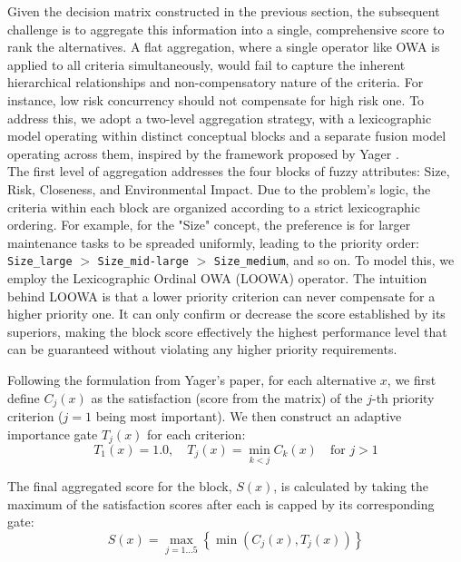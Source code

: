 Given the decision matrix constructed in the previous section, the subsequent challenge is to aggregate this information into a single, comprehensive score to rank the alternatives. A flat aggregation, where a single operator like OWA is applied to all criteria simultaneously, would fail to capture the inherent hierarchical relationships and non-compensatory nature of the criteria. 
For instance, low risk concurrency should not compensate for high risk one. 
To address this, we adopt a two-level aggregation strategy, with a lexicographic model operating within distinct conceptual blocks and a separate fusion model operating across them, inspired by the framework proposed by Yager \cite{LOOWA}.\\

The first level of aggregation addresses the four blocks of fuzzy attributes: Size, Risk, Closeness, and Environmental Impact. Due to the problem's logic, the criteria within each block are organized according to a strict lexicographic ordering. For example, for the "Size" concept, the preference is for larger maintenance tasks to be spreaded uniformly, leading to the priority order: \texttt{Size\_large} $>$ \texttt{Size\_mid-large} $>$ \texttt{Size\_medium}, and so on. 
To model this, we employ the Lexicographic Ordinal OWA (LOOWA) operator. 
The intuition behind LOOWA is that a lower priority criterion can never compensate for a higher priority one. It can only confirm or decrease the score established by its superiors, making the block score effectively the highest performance level that can be guaranteed without violating any higher priority requirements.

Following the formulation from Yager's paper, for each alternative $x$, we first define $C_j(x)$ as the satisfaction (score from the matrix) of the $j$-th priority criterion ($j=1$ being most important). We then construct an adaptive importance gate $T_j(x)$ for each criterion:
\begin{equation}
T_1(x) = 1.0, \quad T_j(x) = \min_{k<j} C_k(x) \quad \text{for } j>1
\end{equation}

The final aggregated score for the block, $S(x)$, is calculated by taking the maximum of the satisfaction scores after each is capped by its corresponding gate:
\begin{equation}
S(x) = \max_{j=1...5} \left\{ \min \left( C_j(x), T_j(x) \right) \right\}
\end{equation}

